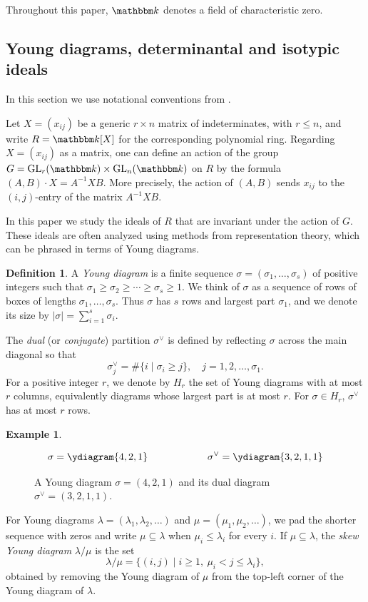 \documentclass[11pt, reqno]{amsart}
\numberwithin{equation}{section}
\theoremstyle{definition}
\newtheorem{definition}[theorem]{Definition}
\newtheorem{example}[theorem]{Example}
\DeclareMathOperator{\GL}{GL}
\newcommand{\kk}{{\mathbbm k}}
\newcommand{\s}{\sigma}
\begin{document}
Throughout this paper, $\kk$ denotes a field of characteristic zero.

\subsection{Young diagrams, determinantal and isotypic ideals}

In this section we use notational conventions from \cite{deconcini1980young}.

Let $X=(x_{ij})$ be a generic $r\times n$ matrix of indeterminates, with $r\leq n$, and write $R=\kk[X]$ for the corresponding polynomial ring.
Regarding $X=(x_{ij})$ as a matrix, one can define an action of the group $G=\GL_r(\kk)\times \GL_n(\kk)$ on $R$ by the formula $(A,B)\cdot X=A^{-1}XB$. More precisely, the action of $(A,B)$ sends $x_{ij}$ to the $(i,j)$-entry of the matrix $A^{-1}XB$.

In this paper we study the ideals of $R$ that are invariant under the action of $G$. These ideals are often analyzed using methods from representation theory, which can be phrased in terms of Young diagrams.

\begin{definition}
A \emph{Young diagram} is a finite sequence $\sigma=(\sigma_1,\ldots,\sigma_s)$
of positive integers such that
$
\sigma_1 \ge \sigma_2 \ge \cdots \ge \sigma_s \ge 1.
$
We think of $\sigma$ as a sequence of rows of boxes of lengths $\sigma_1,\ldots,\sigma_s$. Thus $\sigma$ has $s$ rows and largest part $\sigma_1$, and we denote its size by $|\s|=\sum_{i=1}^s \s_i$.

The \emph{dual} (or \emph{conjugate}) partition $\sigma^\vee$ is defined by reflecting $\s$ across the main diagonal so that
\[
\sigma^\vee_j = \#\{ i \mid \sigma_i \ge j \}, \quad j = 1, 2, \dots, \sigma_1.
\]
For a positive integer $r$, we denote by $H_r$ the set of Young diagrams with at most $r$ columns, equivalently diagrams whose largest part
is at most $r$. For $\s\in H_r$, $\s^\vee$  has at most $r$ rows.
\begin{example}\label{ex: dual}
\phantom{a}
\begin{figure}[h]
\centering
\[
\sigma=\ydiagram{4,2,1}
\qquad\qquad \qquad
\sigma^\vee=\ydiagram{3,2,1,1}
\]
\caption{A Young diagram $\sigma=(4,2,1)$  and its dual
diagram $\sigma^\vee=(3,2,1,1)$.}
\end{figure}
\end{example}
For Young diagrams $\lambda=(\lambda_1,\lambda_2,\ldots)$ and $\mu=(\mu_1,\mu_2,\ldots)$, we pad the shorter sequence with zeros and write $\mu\subseteq\lambda$ when $\mu_i\leq\lambda_i$ for every $i$. If $\mu\subseteq\lambda$, the \emph{skew Young diagram} $\lambda/\mu$ is the set
\[
\lambda/\mu=\{(i,j)\mid i\geq1,\ \mu_i<j\leq\lambda_i\},
\]
obtained by removing the Young diagram of $\mu$ from the top-left corner of the Young diagram of $\lambda$.
\end{definition}
\end{document}
